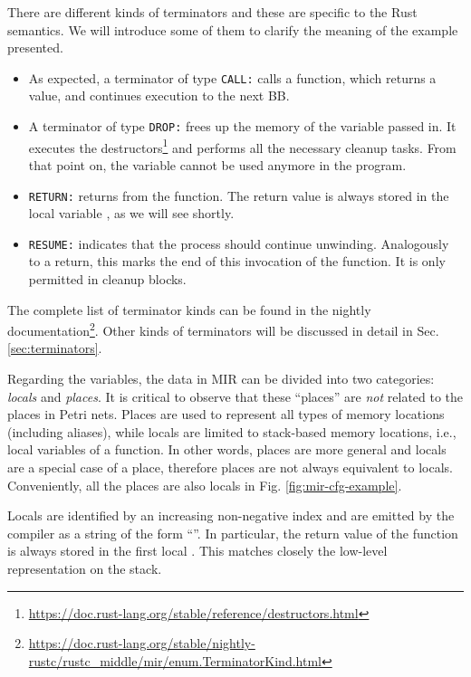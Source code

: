 There are different kinds of terminators and these are specific to the Rust semantics.
We will introduce some of them to clarify the meaning of the example presented.

\begin{itemize}
    \item As expected, a terminator of type \texttt{CALL:} calls a function, which returns a value,
          and continues execution to the next \acrshort{BB}.
    \item A terminator of type \texttt{DROP:} frees up the memory of the variable passed in.
          It executes the destructors\footnote{\url{https://doc.rust-lang.org/stable/reference/destructors.html}}
          and performs all the necessary cleanup tasks.
          From that point on, the variable cannot be used anymore in the program.
    \item \texttt{RETURN:} returns from the function.
          The return value is always stored in the local variable , as we will see shortly.
    \item \texttt{RESUME:} indicates that the process should continue unwinding.
          Analogously to a return, this marks the end of this invocation of the function.
          It is only permitted in cleanup blocks.
\end{itemize}

The complete list of terminator kinds can be found in the nightly
documentation\footnote{\url{https://doc.rust-lang.org/stable/nightly-rustc/rustc_middle/mir/enum.TerminatorKind.html}}.
Other kinds of terminators will be discussed in detail in Sec. \ref{sec:terminators}.

Regarding the variables, the data in \acrshort{MIR} can be divided into two categories:
\emph{locals} and \emph{places}.
It is critical to observe that these ``places'' are
\emph{not} related to the places in Petri nets.
Places are used to represent all types of memory locations (including aliases),
while locals are limited to stack-based memory locations,
i.e., local variables of a function.
In other words, places are more general and locals are a special case of a place,
therefore places are not always equivalent to locals.
Conveniently, all the places are also locals in Fig. \ref{fig:mir-cfg-example}.

Locals are identified by an increasing non-negative index
and are emitted by the compiler as a string of the form ``''.
In particular, the return value of the function
is always stored in the first local .
This matches closely the low-level representation on the stack.

